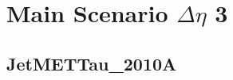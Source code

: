 \documentclass[11pt]{book}
\begin{document}
\newpage
\chapter{Main Scenario $\Delta\eta$ 3 }
\section{JetMETTau\_2010A}

\begin{comment}

\subsection{Pythia 6 Z2* Response Matrix}

\begin{figure}[ht]
\centering
\texttt{[image: ../output/check\_response/png/pythia6\_z2\_jetmettau\_delta\_phi\_deta3\_response.png]}
\caption{$\Delta\phi$ main scenario deta3 JetMETTau\_2010A - Pythia 6 Z2* response matrix}
\label{p6_jetmettau_delta_phi_deta3_response}
\end{figure}

\begin{figure}[ht]
\centering
\texttt{[image: ../output/check\_response/png/pythia6\_z2\_jetmettau\_delta\_phi\_deta3\_response\_norm.png]}
\caption{$\Delta\phi$ main scenario deta3 JetMETTau\_2010A - Pythia 6 Z2* response matrix normalized}
\label{p6_jetmettau_delta_phi_deta3_response_norm}
\end{figure}

\begin{figure}[ht]
\centering
\texttt{[image: ../output/check\_response/png/pythia6\_z2\_jetmettau\_delta\_phi\_deta3\_response\_all.png]}
\caption{$\Delta\phi$ main scenario deta3 JetMETTau\_2010A - Pythia 6 Z2* response matrix with fakes and miss}
\label{p6_jetmettau_delta_phi_deta3_response_all}
\end{figure}

\begin{figure}[ht]
\centering
\texttt{[image: ../output/check\_response/png/pythia6\_z2\_jetmettau\_delta\_phi\_deta3\_response\_all\_norm.png]}
\caption{$\Delta\phi$ main scenario deta3 JetMETTau\_2010A - Pythia 6 Z2* response matrix with fakes and miss normalized}
\label{p6_jetmettau_delta_phi_deta3_response_all_norm}
\end{figure}

\begin{figure}[ht]
\centering
\texttt{[image: ../output/check\_response/png/pythia6\_z2\_jetmettau\_delta\_phi\_deta3\_fakes.png]}
\texttt{[image: ../output/check\_response/png/pythia6\_z2\_jetmettau\_delta\_phi\_deta3\_miss.png]}
\caption{$\Delta\phi$ main scenario deta3 JetMETTau\_2010A - Pythia 6 Z2* fakes and miss distributions}
\label{p6_jetmettau_delta_phi_deta3_fakesmiss}
\end{figure}



\end{comment}
\end{document}
